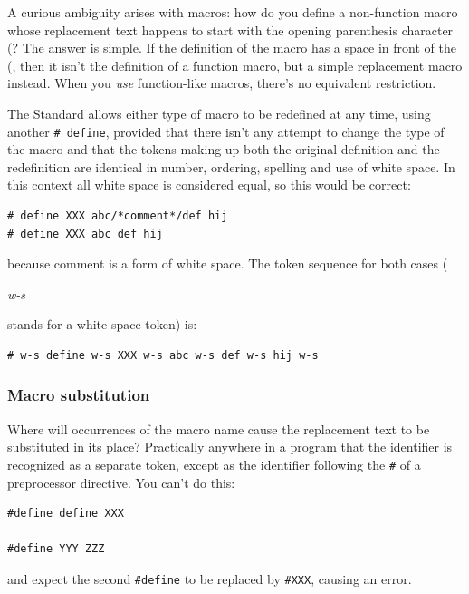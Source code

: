    A curious ambiguity arises with macros: how do you define
    a non-function macro whose replacement text happens to start with the
    opening parenthesis character (? The answer is simple. If the definition
    of the macro has a space in front of the (, then it isn't the definition
    of a function macro, but a simple replacement macro instead. When you
    \textit{use} function-like macros, there's no equivalent
    restriction.


   The Standard allows either type of macro to be redefined at any time,
    using another \texttt{\# define}, provided that there isn't any
    attempt to change the type of the macro and that the tokens making up
    both the original definition and the redefinition are identical in
    number, ordering, spelling and use of white space. In this context all
    white space is considered equal, so this would be correct:


   \begin{Verbatim}
# define XXX abc/*comment*/def hij
# define XXX abc def hij
\end{Verbatim}

   because comment is a form of white space. The token sequence for both
    cases (\begin{center}\textit{w-s}\end{center}

 stands for a white-space token) is:


   \begin{Verbatim}
# w-s define w-s XXX w-s abc w-s def w-s hij w-s
\end{Verbatim}

   \subsubsection{Macro substitution}
    

    Where will occurrences of the macro name cause the replacement text
     to be substituted in its place? Practically anywhere in a program that
     the identifier is recognized as a separate token, except as the
     identifier following the \texttt{\#} of a preprocessor directive.
     You can't do this:


    \begin{Verbatim}
#define define XXX

#define YYY ZZZ
\end{Verbatim}

    and expect the second \texttt{\#define} to be replaced by
     \texttt{\#XXX}, causing an error.


